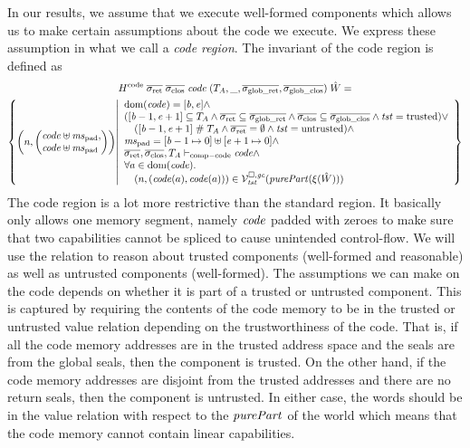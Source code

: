 \begin{jversion}
In our results, we assume that we execute well-formed components which allows us to make certain assumptions about the code we execute.
We express these assumption in what we call a \emph{code region}.
The invariant of the code region is defined as
\begin{multline*}
  H^\mathrm{code} \; \sigrets \; \sigcloss \; \code \; (\ta,\_,\gsigrets,\gsigcloss) \; \hat{W} =\\
  \left\{\npair{\arraycolsep=0pt\left(\array{l}\code \uplus \mspad,\\ \code \uplus \mspad\endarray\right)} \middle|
    \begin{array}{l}
    \dom(\code) = [\baddr,\eaddr] \wedge \\
      ([\baddr - 1, \eaddr + 1] \subseteq \ta \wedge \sigrets \subseteq \gsigrets \wedge \sigcloss \subseteq \gsigcloss \wedge \trust = \trusted) \vee \\
      \quad ([\baddr-1,\eaddr+1]\mathrel{\#} \ta \wedge \sigrets = \emptyset \wedge \trust =\untrusted) \wedge \\
      \mspad = [\baddr-1 \mapsto 0] \uplus [\eaddr + 1 \mapsto 0]\wedge\\
      \sigrets,\sigcloss,\ta \vdash_{\mathrm{comp-code}} \code \wedge\\
      \forall a \in \dom(\code)\ldotp\\
      \quad\npair{(\code(a),\code(a))} \in \lrvg{\trust}(\purePart{\xi(\hat{W})})
    \end{array}
  \right\}
\end{multline*}
The code region is a lot more restrictive than the standard region.
It basically only allows one memory segment, namely $\mathit{code}$ padded with zeroes to make sure that two capabilities cannot be spliced to cause unintended control-flow.
We will use the relation to reason about trusted components (well-formed and reasonable) as well as untrusted components (well-formed).
The assumptions we can make on the code depends on whether it is part of a trusted or untrusted component.
This is captured by requiring the contents of the code memory to be in the trusted or untrusted value relation depending on the trustworthiness of the code.
That is, if all the code memory addresses are in the trusted address space and the seals are from the global seals, then the component is trusted.
On the other hand, if the code memory addresses are disjoint from the trusted addresses and there are no return seals, then the component is untrusted.
In either case, the words should be in the value relation with respect to the $\purePart{}$ of the world which means that the code memory cannot contain linear capabilities.


\end{jversion}
